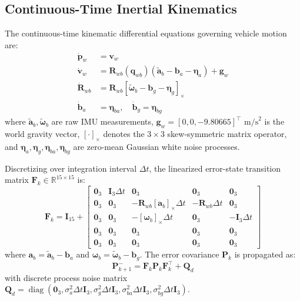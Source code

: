 \documentclass[lettersize,journal]{IEEEtran}
\begin{document}
\subsection{Continuous-Time Inertial Kinematics}
The continuous-time kinematic differential equations governing vehicle motion are:
\begin{align}
\dot{\mathbf{p}}_w &= \mathbf{v}_w \\
\dot{\mathbf{v}}_w &= \mathbf{R}_{wb}(\mathbf{q}_{wb}) (\tilde{\mathbf{a}}_b - \mathbf{b}_a - \boldsymbol{\eta}_a) + \mathbf{g}_w \\
\dot{\mathbf{R}}_{wb} &= \mathbf{R}_{wb} [ \tilde{\boldsymbol{\omega}}_b - \mathbf{b}_g - \boldsymbol{\eta}_g ]_\times \\
\dot{\mathbf{b}}_a &= \boldsymbol{\eta}_{ba}, \quad \dot{\mathbf{b}}_g = \boldsymbol{\eta}_{bg}
\end{align}
where $\tilde{\mathbf{a}}_b, \tilde{\boldsymbol{\omega}}_b$ are raw IMU measurements, $\mathbf{g}_w = [0, 0, -9.80665]^\top\text{ m/s}^2$ is the world gravity vector, $[\cdot]_\times$ denotes the $3 \times 3$ skew-symmetric matrix operator, and $\boldsymbol{\eta}_a, \boldsymbol{\eta}_g, \boldsymbol{\eta}_{ba}, \boldsymbol{\eta}_{bg}$ are zero-mean Gaussian white noise processes.

Discretizing over integration interval $\Delta t$, the linearized error-state transition matrix $\mathbf{F}_k \in \mathbb{R}^{15 \times 15}$ is:
\begin{equation}
\mathbf{F}_k = \mathbf{I}_{15} + \begin{bmatrix}
\mathbf{0}_3 & \mathbf{I}_3 \Delta t & \mathbf{0}_3 & \mathbf{0}_3 & \mathbf{0}_3 \\
\mathbf{0}_3 & \mathbf{0}_3 & -\mathbf{R}_{wb} [\mathbf{a}_b]_\times \Delta t & -\mathbf{R}_{wb} \Delta t & \mathbf{0}_3 \\
\mathbf{0}_3 & \mathbf{0}_3 & -[\boldsymbol{\omega}_b]_\times \Delta t & \mathbf{0}_3 & -\mathbf{I}_3 \Delta t \\
\mathbf{0}_3 & \mathbf{0}_3 & \mathbf{0}_3 & \mathbf{0}_3 & \mathbf{0}_3 \\
\mathbf{0}_3 & \mathbf{0}_3 & \mathbf{0}_3 & \mathbf{0}_3 & \mathbf{0}_3
\end{bmatrix}
\end{equation}
where $\mathbf{a}_b = \tilde{\mathbf{a}}_b - \mathbf{b}_a$ and $\boldsymbol{\omega}_b = \tilde{\boldsymbol{\omega}}_b - \mathbf{b}_g$. 
The error covariance $\mathbf{P}_k$ is propagated as:
\begin{equation}
\mathbf{P}_{k+1}^- = \mathbf{F}_k \mathbf{P}_k \mathbf{F}_k^\top + \mathbf{Q}_d
\end{equation}
with discrete process noise matrix $\mathbf{Q}_d = \operatorname{diag}(\mathbf{0}_3, \sigma_a^2 \Delta t \mathbf{I}_3, \sigma_g^2 \Delta t \mathbf{I}_3, \sigma_{ba}^2 \Delta t \mathbf{I}_3, \sigma_{bg}^2 \Delta t \mathbf{I}_3)$.
\end{document}
